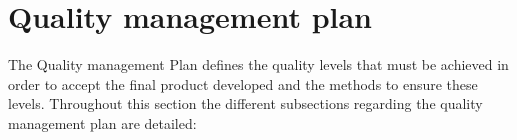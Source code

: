 \chapter{Quality management plan}
The Quality management Plan defines the quality levels that must be achieved in order to accept the final product developed and the methods to ensure these levels. Throughout this section the different subsections regarding the quality management plan are detailed: 



